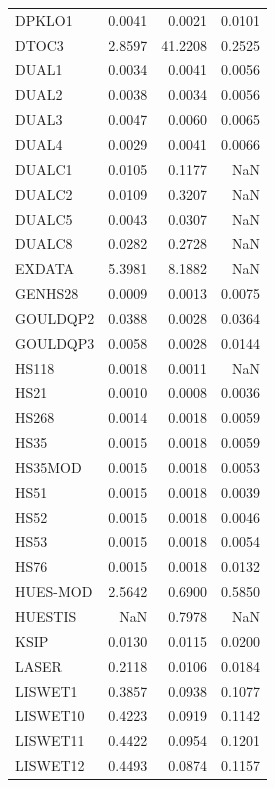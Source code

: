 \begin{longtable}{lrrr}
DPKLO1   &   0.0041 &    0.0021 &  0.0101 \\
DTOC3    &   2.8597 &   41.2208 &  0.2525 \\
DUAL1    &   0.0034 &    0.0041 &  0.0056 \\
DUAL2    &   0.0038 &    0.0034 &  0.0056 \\
DUAL3    &   0.0047 &    0.0060 &  0.0065 \\
DUAL4    &   0.0029 &    0.0041 &  0.0066 \\
DUALC1   &   0.0105 &    0.1177 &     NaN \\
DUALC2   &   0.0109 &    0.3207 &     NaN \\
DUALC5   &   0.0043 &    0.0307 &     NaN \\
DUALC8   &   0.0282 &    0.2728 &     NaN \\
EXDATA   &   5.3981 &    8.1882 &     NaN \\
GENHS28  &   0.0009 &    0.0013 &  0.0075 \\
GOULDQP2 &   0.0388 &    0.0028 &  0.0364 \\
GOULDQP3 &   0.0058 &    0.0028 &  0.0144 \\
HS118    &   0.0018 &    0.0011 &     NaN \\
HS21     &   0.0010 &    0.0008 &  0.0036 \\
HS268    &   0.0014 &    0.0018 &  0.0059 \\
HS35     &   0.0015 &    0.0018 &  0.0059 \\
HS35MOD  &   0.0015 &    0.0018 &  0.0053 \\
HS51     &   0.0015 &    0.0018 &  0.0039 \\
HS52     &   0.0015 &    0.0018 &  0.0046 \\
HS53     &   0.0015 &    0.0018 &  0.0054 \\
HS76     &   0.0015 &    0.0018 &  0.0132 \\
HUES-MOD &   2.5642 &    0.6900 &  0.5850 \\
HUESTIS  &      NaN &    0.7978 &     NaN \\
KSIP     &   0.0130 &    0.0115 &  0.0200 \\
LASER    &   0.2118 &    0.0106 &  0.0184 \\
LISWET1  &   0.3857 &    0.0938 &  0.1077 \\
LISWET10 &   0.4223 &    0.0919 &  0.1142 \\
LISWET11 &   0.4422 &    0.0954 &  0.1201 \\
LISWET12 &   0.4493 &    0.0874 &  0.1157 \\

\end{longtable}
